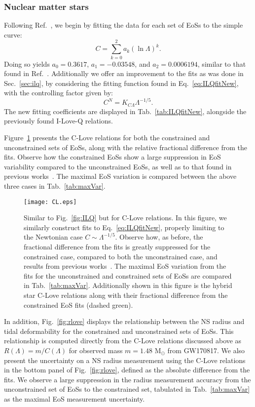\documentclass[prd,twocolumn,nofootinbib,superscriptaddress,amsmath,amssymb]{revtex4-1}
\begin{document}
\subsubsection{Nuclear matter stars}\label{sec:clove-nuc}
Following Ref.~\cite{Yagi:binLove}, we begin by fitting the data for each set of EoSs to the simple curve:
\begin{equation}
C = \sum^2_{k=0} a_k (\ln{\Lambda})^k.
\end{equation}
Doing so yields $a_0 = 0.3617$, $a_1 = -0.03548$, and $a_2 = 0.0006194$, similar to that found in Ref.~\cite{Yagi:binLove}.
Additionally we offer an improvement to the fits as was done in Sec.~\ref{sec:ilq}, by considering the fitting function found in Eq.~\ref{eq:ILQfitNew}, with the controlling factor given by:
\begin{equation}
C^N=K_{C\Lambda}\Lambda^{-1/5}.\label{eq:cloveFit}
\end{equation}
The new fitting coefficients are displayed in Tab.~\ref{tab:ILQfitNew}, alongside the previously found I-Love-Q relations.

Figure~\ref{fig:clove} presents the C-Love relations for both the constrained and unconstrained sets of EoSs, along with the relative fractional difference from the fits. 
Observe how the constrained EoSs show a large suppression in EoS variability compared to the unconstrained EoSs, as well as to that found in previous works~\cite{Yagi:binLove}.
The maximal EoS variation is compared between the above three cases in Tab.~\ref{tab:maxVar}.
\begin{figure}
\begin{center} 
\texttt{[image: CL.eps]}
\end{center}
\caption{
Similar to Fig.~\ref{fig:ILQ} but for C-Love relations.
In this figure, we similarly construct fits to  Eq.~\ref{eq:ILQfitNew}, properly limiting to the Newtonian case $C \sim \Lambda^{-1/5}$.
Observe how, as before, the fractional difference from the fits is greatly suppressed for the constrained case, compared to both the unconstrained case, and results from previous works~\cite{Yagi:binLove}.
The maximal EoS variation from the fits for the unconstrained and constrained sets of EoSs are compared in Tab.~\ref{tab:maxVar}.
Additionally shown in this figure is the hybrid star C-Love relations along with their fractional difference from the constrained EoS fits (dashed green).
}
\label{fig:clove}
\end{figure} 


In addition, Fig.~\ref{fig:rlove} displays the relationship between the NS radius and tidal deformability for the constrained and unconstrained sets of EoSs.
This relationship is computed directly from the C-Love relations discussed above as $R(\Lambda)=m/C(\Lambda)$ for observed mass $m=1.48\text{ M}_{\odot}$ from GW170817.
We also present the uncertainty on a NS radius measurement using the C-Love relations in the bottom panel of Fig.~\ref{fig:rlove}, defined as the absolute difference from the fits.
We observe a large suppression in the radius measurement accuracy from the unconstrained set of EoSs to the constrained set, tabulated in Tab.~\ref{tab:maxVar} as the maximal EoS measurement uncertainty.
\end{document}
